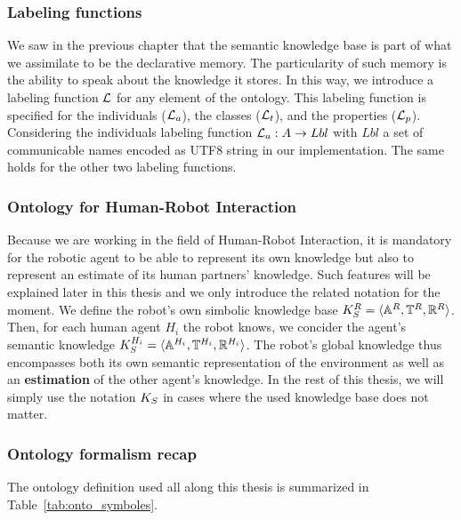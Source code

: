 \subsubsection{Labeling functions}

We saw in the previous chapter that the semantic knowledge base is part of what we assimilate to be the declarative memory. The particularity of such memory is the ability to speak about the knowledge it stores. In this way, we introduce a labeling function $\mathcal{L}$ for any element of the ontology. This labeling function is specified for the individuals ($\mathcal{L}_a$), the classes ($\mathcal{L}_t$), and the properties ($\mathcal{L}_p$). Considering the individuals labeling function $\mathcal{L}_a: A \rightarrow Lbl$ with $Lbl$ a set of communicable names encoded as UTF8 string in our implementation. The same holds for the other two labeling functions.

\subsubsection{Ontology for Human-Robot Interaction}

Because we are working in the field of Human-Robot Interaction, it is mandatory for the robotic agent to be able to represent its own knowledge but also to represent an estimate of its human partners' knowledge. Such features will be explained later in this thesis and we only introduce the related notation for the moment.
We define the robot's own simbolic knowledge base $K_S^R = \langle \mathbb{A}^R, \mathbb{T}^R, \mathbb{R}^R\rangle$.
Then, for each human agent $H_i$ the robot knows, we concider the agent's semantic knowledge $K_S^{H_i} = \langle \mathbb{A}^{H_i}, \mathbb{T}^{H_i}, \mathbb{R}^{H_i} \rangle$.
The robot's global knowledge thus encompasses both its own semantic representation of the environment as well as an \textbf{estimation} of the other agent's knowledge.
In the rest of this thesis, we will simply use the notation $K_S$ in cases where the used knowledge base does not matter.

\subsubsection{Ontology formalism recap}

The ontology definition used all along this thesis is summarized in Table~\ref{tab:onto_symboles}.

